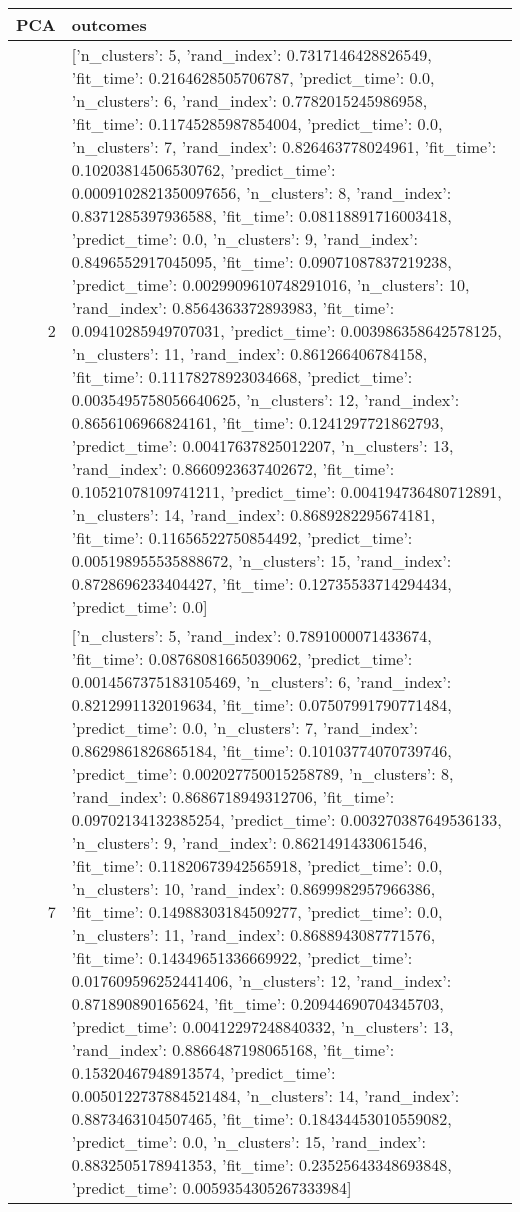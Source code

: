 \begin{tabular}{rl}
\toprule
PCA & outcomes \\
\midrule
2 & [{'n_clusters': 5, 'rand_index': 0.7317146428826549, 'fit_time': 0.2164628505706787, 'predict_time': 0.0}, {'n_clusters': 6, 'rand_index': 0.7782015245986958, 'fit_time': 0.11745285987854004, 'predict_time': 0.0}, {'n_clusters': 7, 'rand_index': 0.826463778024961, 'fit_time': 0.10203814506530762, 'predict_time': 0.0009102821350097656}, {'n_clusters': 8, 'rand_index': 0.8371285397936588, 'fit_time': 0.08118891716003418, 'predict_time': 0.0}, {'n_clusters': 9, 'rand_index': 0.8496552917045095, 'fit_time': 0.09071087837219238, 'predict_time': 0.0029909610748291016}, {'n_clusters': 10, 'rand_index': 0.8564363372893983, 'fit_time': 0.09410285949707031, 'predict_time': 0.003986358642578125}, {'n_clusters': 11, 'rand_index': 0.861266406784158, 'fit_time': 0.11178278923034668, 'predict_time': 0.0035495758056640625}, {'n_clusters': 12, 'rand_index': 0.8656106966824161, 'fit_time': 0.1241297721862793, 'predict_time': 0.00417637825012207}, {'n_clusters': 13, 'rand_index': 0.8660923637402672, 'fit_time': 0.10521078109741211, 'predict_time': 0.004194736480712891}, {'n_clusters': 14, 'rand_index': 0.8689282295674181, 'fit_time': 0.11656522750854492, 'predict_time': 0.005198955535888672}, {'n_clusters': 15, 'rand_index': 0.8728696233404427, 'fit_time': 0.12735533714294434, 'predict_time': 0.0}] \\
7 & [{'n_clusters': 5, 'rand_index': 0.7891000071433674, 'fit_time': 0.08768081665039062, 'predict_time': 0.0014567375183105469}, {'n_clusters': 6, 'rand_index': 0.8212991132019634, 'fit_time': 0.07507991790771484, 'predict_time': 0.0}, {'n_clusters': 7, 'rand_index': 0.8629861826865184, 'fit_time': 0.10103774070739746, 'predict_time': 0.002027750015258789}, {'n_clusters': 8, 'rand_index': 0.8686718949312706, 'fit_time': 0.09702134132385254, 'predict_time': 0.003270387649536133}, {'n_clusters': 9, 'rand_index': 0.8621491433061546, 'fit_time': 0.11820673942565918, 'predict_time': 0.0}, {'n_clusters': 10, 'rand_index': 0.8699982957966386, 'fit_time': 0.14988303184509277, 'predict_time': 0.0}, {'n_clusters': 11, 'rand_index': 0.8688943087771576, 'fit_time': 0.14349651336669922, 'predict_time': 0.017609596252441406}, {'n_clusters': 12, 'rand_index': 0.871890890165624, 'fit_time': 0.20944690704345703, 'predict_time': 0.00412297248840332}, {'n_clusters': 13, 'rand_index': 0.8866487198065168, 'fit_time': 0.15320467948913574, 'predict_time': 0.0050122737884521484}, {'n_clusters': 14, 'rand_index': 0.8873463104507465, 'fit_time': 0.18434453010559082, 'predict_time': 0.0}, {'n_clusters': 15, 'rand_index': 0.8832505178941353, 'fit_time': 0.23525643348693848, 'predict_time': 0.0059354305267333984}] \\

\end{tabular}
